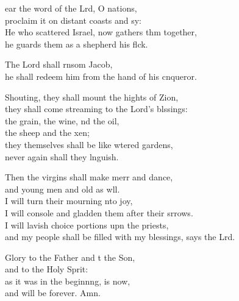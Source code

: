 \settowidth{\versewidth}{and my people shall be filled with my blessings, says the Lord.}
\begin{psalmverse}%
  \begin{patverse}
    ear the word of the Lrd, O nations,\Med\\
proclaim it on distant coasts and sy:\\
He who scattered Israel, now gathers thm together,\Med\\
he guards them as a shepherd his flck.

The Lord shall rnsom Jacob,\Med\\
he shall redeem him from the hand of his cnqueror.

Shouting, they shall mount the hights of Zion,\Med\\
they shall come streaming to the Lord’s blssings:\\
the grain, the wine, nd the oil,\Med\\
the sheep and the xen;\\
they themselves shall be like wtered gardens,\Med\\
never again shall they lnguish.

Then the virgins shall make merr and dance,\Med\\
and young men and old as wll.\\
I will turn their mourning \pointup{\i}nto joy,\Med\\
I will console and gladden them after their srrows.\\
I will lavish choice portions upn the priests,\Med\\
and my people shall be filled with my blessings, says the Lrd.

Glory to the Father and t the Son,\Med\\
and to the Holy Sp\pointup{\i}rit:\\
as it was in the beginn\pointup{\i}ng, is now,\Med\\
and will be forever. Amn. 
  \end{patverse}
\end{psalmverse}
